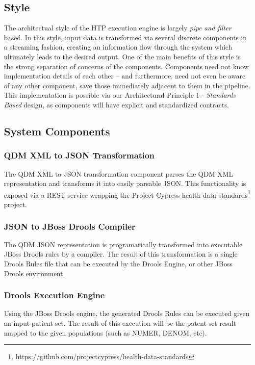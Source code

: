 \documentclass{amia}
\begin{document}
\subsection*{Style}
The architectual style of the HTP execution engine is largely \textit{pipe and filter} based. In this style, input data is transformed via several discrete components in a streaming fashion, creating an information flow through the system which ultimately leads to the desired output\cite{garlan1993introduction}. One of the main benefits of this style is the strong separation of concerns of the components. Components need not know implementation details of each other -- and furthermore, need not even be aware of any other component, save those immediately adjacent to them in the pipeline. This implementation is possible via our Architectural Principle 1 - \textit{Standards Based} design, as components will have explicit and standardized contracts.

\subsection*{System Components}
\subsubsection*{QDM XML to JSON Transformation}
The QDM XML to JSON transformation component parses the QDM XML representation and transforms it into easily parsable JSON. This functionality is exposed via a REST service wrapping the Project Cypress health-data-standards\footnote{https://github.com/projectcypress/health-data-standards} project.

\subsubsection*{JSON to JBoss Drools Compiler}
The QDM JSON representation is programatically transformed into executable JBoss Drools rules by a compiler. The result of this transformation is a single Drools Rules file that can be executed by the Drools Engine, or other JBoss Drools environment.

\subsubsection*{Drools Execution Engine}
Using the JBoss Drools engine, the generated Drools Rules can be executed given an input patient set. The result of this execution will be the patent set result mapped to the given populations (such as NUMER, DENOM, etc).
\end{document}
